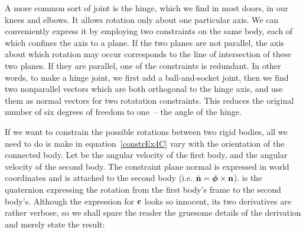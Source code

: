 A more common sort of joint is the hinge, which we find in most doors, in our knees and elbows.
It allows rotation only about one particular axis. We can conveniently express it by employing two
constraints on the same body, each of which confines the axis to a plane. If the two planes are
not parallel, the axis about which rotation may occur corresponds to the line of intersection of
these two planes. If they are parallel, one of the constraints is redundant. In other words,
to make a hinge joint, we first add a ball-and-socket joint, then we find two nonparallel vectors
which are both orthogonal to the hinge axis, and use them as normal vectors for two rotatation
constraints. This reduces the original number of six degrees of freedom to one~-- the angle of the
hinge.

If we want to constrain the possible rotations between two rigid bodies, all we need to do is make
 in equation~\ref{constrEx4C} vary with the orientation of the connected body.
Let \ve{\omega} be the angular velocity of the first body, and \ve{\phi} the angular velocity
of the second body. The constraint plane normal  is expressed in world coordinates and
is attached to the second body (i.e. $\dot{\ve{n}} = \ve{\phi}\times\ve{n}$). 
is the quaternion expressing the rotation from the first body's frame to the second body's.
Although the expression for $\ve{c}$ looks so innocent, its two derivatives are rather
verbose, so we shall spare the reader the gruesome details of the derivation and merely state the
result:

